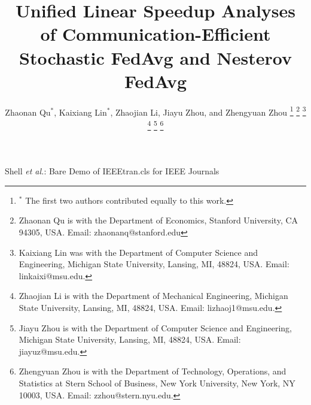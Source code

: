\documentclass[journal]{IEEEtran}
\begin{document}
\title{Unified Linear Speedup Analyses of Communication-Efficient Stochastic FedAvg and Nesterov FedAvg}

\author{Zhaonan Qu$^*$, Kaixiang Lin$^*$, Zhaojian Li, Jiayu Zhou, and Zhengyuan Zhou%
\thanks{$^*$ The first two authors contributed equally to this work.}
\thanks{Zhaonan Qu is with the Department of Economics, Stanford University, CA 94305, USA. Email: {zhaonanq}@stanford.edu}%
\thanks{Kaixiang Lin was with the Department of Computer Science and Engineering, Michigan State University, Lansing, MI, 48824,
USA. Email: {linkaixi}@msu.edu.
}%
\thanks{Zhaojian Li is with the Department of
Mechanical Engineering, Michigan State University, Lansing, MI, 48824,
USA. Email: {lizhaoj1}@msu.edu.}
\thanks{Jiayu Zhou is with the Department of Computer Science and Engineering, Michigan State University, Lansing, MI, 48824,
USA. Email: {jiayuz}@msu.edu.}
\thanks{Zhengyuan Zhou is with the Department of Technology, Operations, and Statistics at Stern School of Business, New York University, New York, NY 10003,
USA. Email: {zzhou}@stern.nyu.edu.}
}



%
{Shell \MakeLowercase{\textit{et al.}}: Bare Demo of IEEEtran.cls for IEEE Journals}

\maketitle
\end{document}

